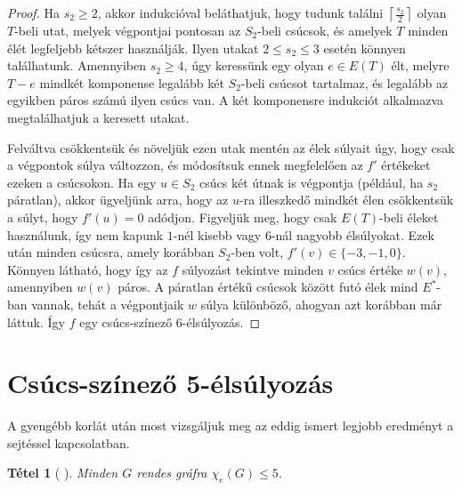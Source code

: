\documentclass[12pt, a4paper]{report}
\newtheorem{tét}{Tétel}[section]
\theoremstyle{remark}
\theoremstyle{definition}
\begin{document}
\begin{proof}
Ha $s_2 \geq 2$, akkor indukcióval beláthatjuk, hogy tudunk találni $\left\lceil \frac{s_2}{2} \right\rceil$ olyan $T$-beli utat, melyek végpontjai pontosan az $S_2$-beli csúcsok, és amelyek $T$ minden élét legfeljebb kétszer használják. Ilyen utakat $2 \leq s_2 \leq 3$ esetén könnyen találhatunk. Amennyiben $s_2 \geq 4$, úgy keressünk egy olyan $e \in E(T)$ élt, melyre $T-e$ mindkét komponense legalább két $S_2$-beli csúcsot tartalmaz, és legalább az egyikben páros számú ilyen csúcs van. A két komponensre indukciót alkalmazva megtalálhatjuk a keresett utakat.

Felváltva csökkentsük és növeljük ezen utak mentén az élek súlyait úgy, hogy csak a végpontok súlya változzon, és módosítsuk ennek megfelelően az $f'$ értékeket ezeken a csúcsokon. Ha egy $u \in S_2$ csúcs két útnak is végpontja (például, ha $s_2$ páratlan), akkor ügyeljünk arra, hogy az $u$-ra illeszkedő mindkét élen csökkentsük a súlyt, hogy $f'(u) = 0$ adódjon. Figyeljük meg, hogy csak $E(T)$-beli éleket használunk, így nem kapunk $1$-nél kisebb vagy $6$-nál nagyobb élsúlyokat. Ezek után minden csúcsra, amely korábban $S_2$-ben volt, $f'(v) \in \lbrace -3, -1, 0 \rbrace$. Könnyen látható, hogy így az $f$ súlyozást tekintve minden $v$ csúcs értéke $w(v)$, amennyiben $w(v)$ páros. A páratlan értékű csúcsok között futó élek mind $E^*$-ban vannak, tehát a végpontjaik $w$ súlya különböző, ahogyan azt korábban már láttuk. Így $f$ egy csúcs-színező $6$-élsúlyozás.
\end{proof}

\section{Csúcs-színező 5-élsúlyozás}
A gyengébb korlát után most vizsgáljuk meg az eddig ismert legjobb eredményt a sejtéssel kapcsolatban. 

\begin{tét}[\citeauthor{Kalkowski2010} \cite{Kalkowski2010}]
Minden $G$ rendes gráfra $\chi_e(G) \leq 5$.
\end{tét}
\end{document}
